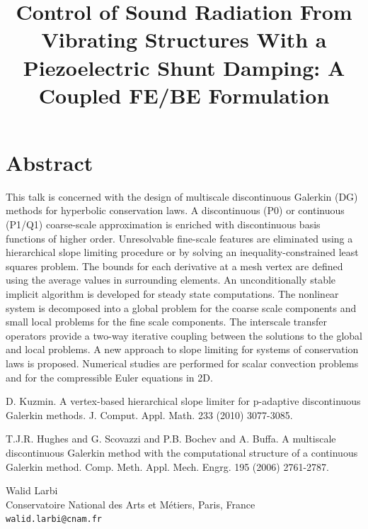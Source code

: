\documentclass[article,A4,11pt]{llncs}%
\begin{document}
\section*{Abstract}
This talk is concerned with the design of multiscale discontinuous Galerkin (DG) methods for hyperbolic conservation laws. A discontinuous (P0) or continuous (P1/Q1) coarse-scale approximation is enriched with discontinuous basis functions of higher order. Unresolvable fine-scale features are eliminated using a hierarchical slope limiting procedure or by solving an inequality-constrained least squares problem. The bounds for each derivative at a mesh vertex are defined using the average values in surrounding elements. An unconditionally stable implicit algorithm is developed for steady state computations. The nonlinear system is decomposed into a global problem for the coarse scale components and small local problems for the fine scale components. The interscale transfer operators provide a two-way iterative coupling between the solutions to the global and local problems. A new approach to slope limiting for systems of conservation laws is proposed. Numerical studies are performed for scalar convection problems and for the compressible Euler equations in 2D.



\begin{thebibliography}{10}
{\sc D. Kuzmin}. { A vertex-based hierarchical slope limiter for p-adaptive discontinuous Galerkin methods}.  J.  Comput.  Appl.  Math.  233  (2010) 3077-3085.

{\sc  T.J.R. Hughes and G. Scovazzi and P.B. Bochev and A. Buffa}. {A multiscale discontinuous Galerkin  method with the computational structure of a continuous Galerkin method}. Comp.  Meth.  Appl.  Mech.  Engrg.  195  (2006) 2761-2787.
\end{thebibliography}

\title{Control of Sound Radiation From Vibrating Structures With a Piezoelectric Shunt Damping: A Coupled FE/BE Formulation}
 \author{} \institute{}
\maketitle
\begin{center}
{\large Walid Larbi}\\
Conservatoire National des Arts et M\'{e}tiers, Paris, France\\
{\tt walid.larbi@cnam.fr}
\end{center}
\end{document}
